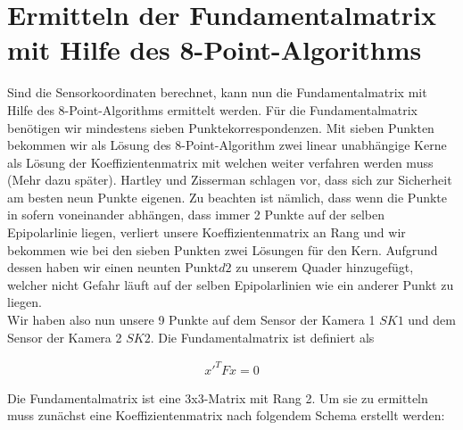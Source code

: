 \section{Ermitteln der Fundamentalmatrix mit Hilfe des 8-Point-Algorithms}
	Sind die Sensorkoordinaten berechnet, kann nun die Fundamentalmatrix mit Hilfe des 8-Point-Algorithms ermittelt werden. Für die Fundamentalmatrix benötigen wir mindestens sieben Punktekorrespondenzen. Mit sieben Punkten bekommen wir als Lösung des 8-Point-Algorithm zwei linear unabhängige Kerne als Lösung der Koeffizientenmatrix mit welchen weiter verfahren werden muss (Mehr dazu später). Hartley und Zisserman schlagen vor, dass sich zur Sicherheit am besten neun Punkte eigenen. Zu beachten ist nämlich, dass wenn die Punkte in sofern voneinander abhängen, dass immer 2 Punkte auf der selben Epipolarlinie liegen, verliert unsere Koeffizientenmatrix an Rang und wir bekommen  wie bei den sieben Punkten zwei Lösungen für den Kern. Aufgrund dessen haben wir einen neunten Punkt\ensuremath{d2} zu unserem Quader hinzugefügt, welcher nicht Gefahr läuft auf der selben Epipolarlinien wie ein anderer Punkt zu liegen.\\

Wir haben also nun unsere 9 Punkte auf dem Sensor der Kamera 1 \ensuremath{SK1} und dem Sensor der Kamera 2 \ensuremath{SK2}. Die Fundamentalmatrix ist definiert als

\begin{gather}
x'^T F x =0
\end{gather}

Die Fundamentalmatrix ist eine 3x3-Matrix mit Rang 2. Um sie zu ermitteln muss zunächst eine Koeffizientenmatrix nach folgendem Schema erstellt werden: 

